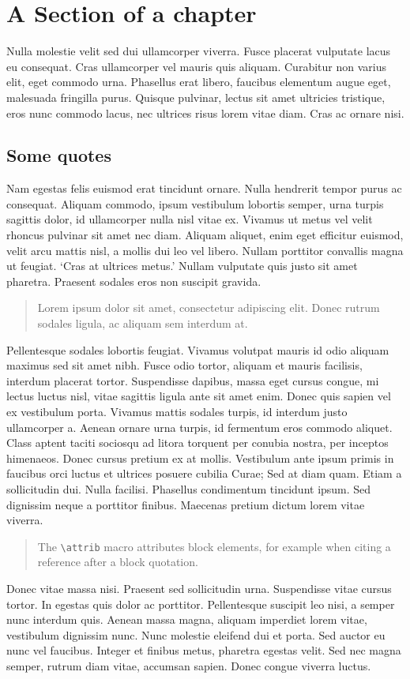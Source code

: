 \section{A Section of a chapter}
Nulla molestie velit sed dui ullamcorper viverra. Fusce placerat vulputate lacus eu consequat. Cras ullamcorper vel mauris quis aliquam. Curabitur non varius elit, eget commodo urna. Phasellus erat libero, faucibus elementum augue eget, malesuada fringilla purus. Quisque pulvinar, lectus sit amet ultricies tristique, eros nunc commodo lacus, nec ultrices risus lorem vitae diam. Cras ac ornare nisi.

\subsection{Some quotes}

Nam egestas felis euismod erat tincidunt ornare. Nulla hendrerit tempor purus ac consequat. Aliquam commodo, ipsum vestibulum lobortis semper, urna turpis sagittis dolor, id ullamcorper nulla nisl vitae ex. Vivamus ut metus vel velit rhoncus pulvinar sit amet nec diam. Aliquam aliquet, enim eget efficitur euismod, velit arcu mattis nisl, a mollis dui leo vel libero. Nullam porttitor convallis magna ut feugiat. `Cras at ultrices metus.' Nullam vulputate quis justo sit amet pharetra. Praesent sodales eros non suscipit gravida.
\begin{quote}
Lorem ipsum dolor sit amet, consectetur adipiscing elit. Donec rutrum sodales ligula, ac aliquam sem interdum at.
\end{quote}

Pellentesque sodales lobortis feugiat. Vivamus volutpat mauris id odio aliquam maximus sed sit amet nibh. Fusce odio tortor, aliquam et mauris facilisis, interdum placerat tortor. Suspendisse dapibus, massa eget cursus congue, mi lectus luctus nisl, vitae sagittis ligula ante sit amet enim. Donec quis sapien vel ex vestibulum porta. Vivamus mattis sodales turpis, id interdum justo ullamcorper a. Aenean ornare urna turpis, id fermentum eros commodo aliquet. Class aptent taciti sociosqu ad litora torquent per conubia nostra, per inceptos himenaeos. Donec cursus pretium ex at mollis. Vestibulum ante ipsum primis in faucibus orci luctus et ultrices posuere cubilia Curae; Sed at diam quam. Etiam a sollicitudin dui. Nulla facilisi. Phasellus condimentum tincidunt ipsum. Sed dignissim neque a porttitor finibus. Maecenas pretium dictum lorem vitae viverra.
\begin{quote}
The \verb|\attrib| macro attributes block elements, for example when citing
a reference after a block quotation.
\end{quote}

Donec vitae massa nisi. Praesent sed sollicitudin urna. Suspendisse vitae cursus tortor. In egestas quis dolor ac porttitor. Pellentesque suscipit leo nisi, a semper nunc interdum quis. Aenean massa magna, aliquam imperdiet lorem vitae, vestibulum dignissim nunc. Nunc molestie eleifend dui et porta. Sed auctor eu nunc vel faucibus. Integer et finibus metus, pharetra egestas velit. Sed nec magna semper, rutrum diam vitae, accumsan sapien. Donec congue viverra luctus.

